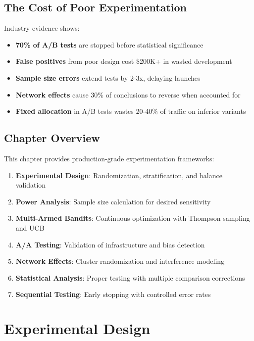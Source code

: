 \subsection{The Cost of Poor Experimentation}

Industry evidence shows:
\begin{itemize}
    \item \textbf{70\% of A/B tests} are stopped before statistical significance
    \item \textbf{False positives} from poor design cost \$200K+ in wasted development
    \item \textbf{Sample size errors} extend tests by 2-3x, delaying launches
    \item \textbf{Network effects} cause 30\% of conclusions to reverse when accounted for
    \item \textbf{Fixed allocation} in A/B tests wastes 20-40\% of traffic on inferior variants
\end{itemize}

\subsection{Chapter Overview}

This chapter provides production-grade experimentation frameworks:

\begin{enumerate}
    \item \textbf{Experimental Design}: Randomization, stratification, and balance validation
    \item \textbf{Power Analysis}: Sample size calculation for desired sensitivity
    \item \textbf{Multi-Armed Bandits}: Continuous optimization with Thompson sampling and UCB
    \item \textbf{A/A Testing}: Validation of infrastructure and bias detection
    \item \textbf{Network Effects}: Cluster randomization and interference modeling
    \item \textbf{Statistical Analysis}: Proper testing with multiple comparison corrections
    \item \textbf{Sequential Testing}: Early stopping with controlled error rates
\end{enumerate}

\section{Experimental Design}

